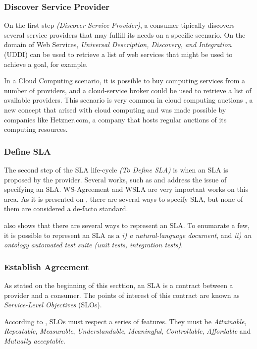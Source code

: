 \subsubsection{Discover Service Provider}
On the first step \textit{(Discover Service Provider)}, a consumer tipically discovers several service providers that may fulfill its needs on a specific scenario. On the domain of Web Services, \textit{Universal Description, Discovery, and Integration} (UDDI) can be used to retrieve a list of web services that might be used to achieve a goal, for example. 

In a Cloud Computing scenario, it is possible to buy computing services from a number of providers, and a cloud-service broker could be used to retrieve a list of available providers. This scenario is very common in cloud computing auctions \cite{7145493}, a new concept that arised with cloud computing and was made possible by companies like Hetzner.com, a company that hosts regular auctions of its computing resources.


\subsubsection{Define SLA}
The second step of the SLA life-cycle \textit{(To Define SLA)} is when an SLA is proposed by the provider. Several works, such as \cite{6846456} and \cite{kouki:hal-00675077} address the issue of specifying an SLA. WS-Agreement \cite{citeulike:2805191} and WSLA \cite{4578560} are very important works on this area. As it is presented on \cite{fabioMartinSM}, there are several ways to specify SLA, but none of them are considered a de-facto standard. 

\cite{fabioMartinSM} also shows that there are several ways to represent an SLA. To enumarate a few, it is possible to represent an SLA as a \textit{i) a natural-language document}, and \textit{ii) an ontology} \textit{automated test suite (unit tests, integration tests)}.

\subsubsection{Establish Agreement}

As stated on the beginning of this secttion, an SLA is a contract between a provider and a consumer. The points of interest of this contract are known as \textit{Service-Level Objectives} (SLOs).

According to \cite{sturm2000foundations}, SLOs must respect a series of features. They must be \textit{Attainable},  \textit{Repeatable},  \textit{Measurable},  \textit{Understandable},  \textit{Meaningful},  \textit{Controllable},  \textit{Affordable} and \textit{Mutually acceptable}. 

